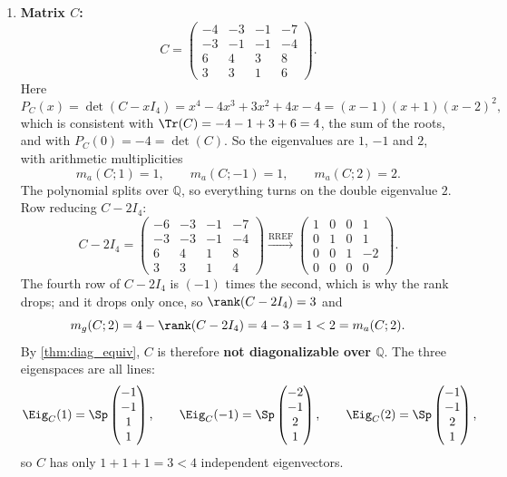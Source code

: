 \begin{exercisesolution*}
\begin{enumerate}[label=\textbf{(\alph*)}]
    \item \textbf{Matrix $C$:}
    \[
    C = \begin{pmatrix} -4 & -3 & -1 & -7 \\ -3 & -1 & -1 & -4 \\ 6 & 4 & 3 & 8 \\ 3 & 3 & 1 & 6 \end{pmatrix}.
    \]
    Here
    \[
    P_C(x) = \det(C - x I_4) = x^4 - 4x^3 + 3x^2 + 4x - 4 = (x-1)(x+1)(x-2)^2,
    \]
    which is consistent with $\Tr(C) = -4 - 1 + 3 + 6 = 4$, the sum of the roots, and with $P_C(0) = -4 = \det(C)$.
    So the eigenvalues are $1$, $-1$ and $2$, with arithmetic multiplicities
    \[
    m_a(C; 1) = 1, \qquad m_a(C; -1) = 1, \qquad m_a(C; 2) = 2.
    \]
    The polynomial splits over $\mathbb{Q}$, so everything turns on the double eigenvalue $2$. Row reducing $C - 2 I_4$:
    \[
    C - 2 I_4 = \begin{pmatrix} -6 & -3 & -1 & -7 \\ -3 & -3 & -1 & -4 \\ 6 & 4 & 1 & 8 \\ 3 & 3 & 1 & 4 \end{pmatrix}
    \xrightarrow{\text{RREF}}
    \begin{pmatrix} 1 & 0 & 0 & 1 \\ 0 & 1 & 0 & 1 \\ 0 & 0 & 1 & -2 \\ 0 & 0 & 0 & 0 \end{pmatrix}.
    \]
    The fourth row of $C - 2I_4$ is $(-1)$ times the second, which is why the rank drops; and it drops only once, so $\rank(C - 2 I_4) = 3$ and
    \[
    m_g(C; 2) = 4 - \rank(C - 2 I_4) = 4 - 3 = 1 < 2 = m_a(C; 2).
    \]
    By \cref{thm:diag_equiv}, $C$ is therefore \textbf{not diagonalizable over $\mathbb{Q}$}. The three eigenspaces are all lines:
    \[
    \Eig_C(1) = \Sp \begin{pmatrix} -1 \\ -1 \\ 1 \\ 1 \end{pmatrix}, \qquad
    \Eig_C(-1) = \Sp \begin{pmatrix} -2 \\ -1 \\ 2 \\ 1 \end{pmatrix}, \qquad
    \Eig_C(2) = \Sp \begin{pmatrix} -1 \\ -1 \\ 2 \\ 1 \end{pmatrix},
    \]
    so $C$ has only $1 + 1 + 1 = 3 < 4$ independent eigenvectors. \qedhere
\end{enumerate}
\end{exercisesolution*}

